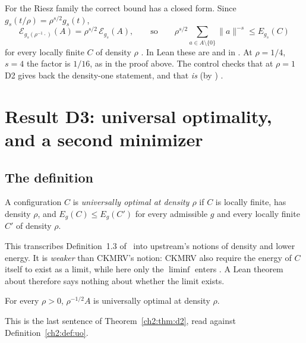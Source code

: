 For the Riesz family the correct bound has a closed form. Since $g_s(t/\rho)=\rho^{s/2}g_s(t)$,
\[
\mathcal{E}_{g_s(\rho^{-1}\cdot)}(A)=\rho^{s/2}\,\mathcal{E}_{g_s}(A),
\qquad\text{so}\qquad \rho^{s/2}\sum_{a\in A\setminus\{0\}}\|a\|^{-s}\le E_{g_s}(C)
\]
for every locally finite $C$ of density $\rho$ \tierA. In Lean these are  and
 in . At $\rho=1/4$, $s=4$ the factor is $1/16$, as in the proof above. The control
 checks that at $\rho=1$ D2 gives back the density-one statement, and  that
 \emph{is}  (by ) \tierA.

\section{Result D3: universal optimality, and a second minimizer}\label{ch2:sec:d3}

\subsection{The definition}
\begin{definition}\label{ch2:def:uo}
A configuration $C$ is \emph{universally optimal at density $\rho$} if $C$ is locally finite, has density $\rho$, and
$E_g(C)\le E_g(C')$ for every admissible $g$ and every locally finite $C'$ of density $\rho$.
\end{definition}

This transcribes Definition~1.3 of~\cite{ckmrv} into upstream's notions of density and lower energy. It is
\emph{weaker} than CKMRV's notion: CKMRV also require the energy of $C$ itself to exist as a limit, while here only the
$\liminf$ enters \tierC. A Lean theorem about  therefore says nothing about whether the limit
exists.

\begin{theorem}\label{ch2:thm:uo}
For every $\rho>0$, $\rho^{-1/2}A$ is universally optimal at density $\rho$.
\end{theorem}
\begin{humanproof}
This is the last sentence of Theorem~\ref{ch2:thm:d2}, read against Definition~\ref{ch2:def:uo}.
\end{humanproof}


